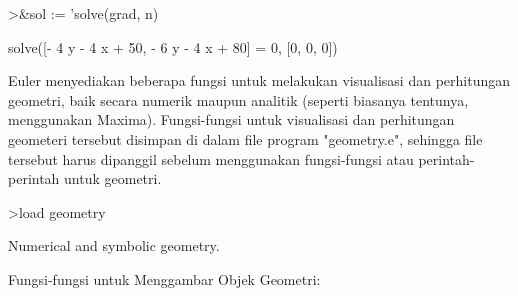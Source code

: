 \documentclass[a4paper,10pt]{article}
\begin{document}
\begin{eulernotebook}
\begin{eulercomment}
\begin{eulercomment}
\begin{eulercomment}
\begin{eulercomment}
\begin{eulercomment}
\begin{eulercomment}
\begin{eulercomment}
\begin{eulercomment}
\begin{eulercomment}
\begin{eulercomment}
\begin{eulercomment}
\begin{eulercomment}
\begin{eulercomment}
\begin{eulercomment}
\begin{eulercomment}
\begin{eulercomment}
\begin{eulercomment}
\begin{eulercomment}
\begin{eulercomment}
\begin{eulercomment}
\begin{eulercomment}
\begin{eulercomment}
\begin{eulercomment}
\begin{eulercomment}
\begin{eulercomment}
\begin{eulercomment}
\begin{eulercomment}
\begin{eulercomment}
\begin{eulercomment}
\begin{eulercomment}
\begin{eulercomment}
\begin{eulercomment}
\begin{eulercomment}
\begin{eulercomment}
\begin{eulercomment}
\begin{eulercomment}
\begin{euleroutput}
\end{euleroutput}
\begin{eulerprompt}
>&sol := 'solve(grad, n)
\end{eulerprompt}
\begin{euleroutput}
  
          solve([- 4 y - 4 x + 50, - 6 y - 4 x + 80] = 0, [0, 0, 0])
  
\end{euleroutput}
\begin{eulercomment}
\begin{eulercomment}
\begin{eulercomment}
Euler menyediakan beberapa fungsi untuk melakukan visualisasi dan
perhitungan geometri, baik secara numerik maupun analitik (seperti
biasanya tentunya, menggunakan Maxima). Fungsi-fungsi untuk
visualisasi dan perhitungan geometeri tersebut disimpan di dalam file
program "geometry.e", sehingga file tersebut harus dipanggil sebelum
menggunakan fungsi-fungsi atau perintah-perintah untuk geometri.
\end{eulercomment}
\begin{eulerprompt}
>load geometry
\end{eulerprompt}
\begin{euleroutput}
  Numerical and symbolic geometry.
\end{euleroutput}
\begin{eulercomment}
Fungsi-fungsi untuk Menggambar Objek Geometri:


\end{eulercomment}
\end{eulercomment}
\end{eulercomment}
\end{eulercomment}
\end{eulercomment}
\end{eulercomment}
\end{eulercomment}
\end{eulercomment}
\end{eulercomment}
\end{eulercomment}
\end{eulercomment}
\end{eulercomment}
\end{eulercomment}
\end{eulercomment}
\end{eulercomment}
\end{eulercomment}
\end{eulercomment}
\end{eulercomment}
\end{eulercomment}
\end{eulercomment}
\end{eulercomment}
\end{eulercomment}
\end{eulercomment}
\end{eulercomment}
\end{eulercomment}
\end{eulercomment}
\end{eulercomment}
\end{eulercomment}
\end{eulercomment}
\end{eulercomment}
\end{eulercomment}
\end{eulercomment}
\end{eulercomment}
\end{eulercomment}
\end{eulercomment}
\end{eulercomment}
\end{eulercomment}
\end{eulercomment}
\end{eulercomment}
\end{eulernotebook}
\end{document}
